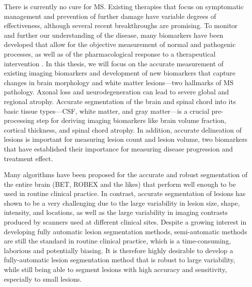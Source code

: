 There is currently no cure for MS. Existing therapies that focus on symptomatic
management and prevention of further damage have variable degrees of
effectiveness, although several recent breakthroughs are promising. To monitor
and further our understanding of the disease, many biomarkers have been
developed that allow for the objective measurement of normal and pathogenic
processes, as well as of the pharmacological response to a therapeutical
intervention \cite{katsavos2013}. In this thesis, we will focus on the accurate
measurement of existing imaging biomarkers and development of new biomarkers
that capture changes in brain morphology and white matter lesions---two
hallmarks of MS pathology. Axonal loss and neurodegeneration can lead to severe
global and regional atrophy. Accurate segmentation of the brain and spinal chord
into its basic tissue types---CSF, white matter, and gray matter---is a crucial
pre-processing step for deriving imaging biomarkers like brain volume fraction,
cortical thickness, and spinal chord atrophy. In addition, accurate delineation
of lesions is important for measuring lesion count and lesion volume, two
biomarkers that have established their importance for measuring disease
progression and treatment effect.

Many algorithms have been proposed for the accurate and robust segmentation of
the entire brain (BET, ROBEX and the likes) that perform well enough to be used
in routine clinical practice. In contrast, accurate segmentation of lesions has
shown to be a very challenging due to the large variability in lesion
size, shape, intensity, and locations, as well as the large variability in
imaging contrasts produced by scanners used at different clinical sites. Despite
a growing interest in developing fully automatic lesion segmentation methods,
semi-automatic methods are still the standard in routine clinical practice,
which is a time-consuming, laborious and potentially biasing. It is therefore
highly desirable to develop a fully-automatic lesion segmentation method that is
robust to large variability, while still being able to segment lesions with
high accuracy and sensitivity, especially to small lesions.

%

